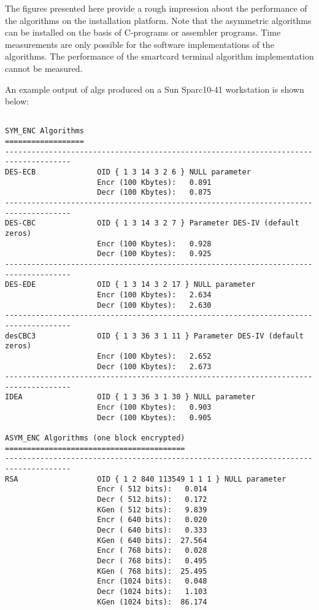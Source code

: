 The figures presented here provide a rough impression about the performance of the algorithms on the 
installation platform. Note that the asymmetric algorithms can be installed on the
basis of C-programs or assembler programs. Time measurements are only possible for the software 
implementations of the algorithms. The performance of the smartcard terminal algorithm
implementation cannot be measured.

An example output of algs produced on a Sun Sparc10-41 workstation is shown below:
{\scriptsize
\begin{verbatim}

SYM_ENC Algorithms
==================
-------------------------------------------------------------------------------------
DES-ECB              OID { 1 3 14 3 2 6 } NULL parameter
                     Encr (100 Kbytes):   0.891  
                     Decr (100 Kbytes):   0.875  
-------------------------------------------------------------------------------------
DES-CBC              OID { 1 3 14 3 2 7 } Parameter DES-IV (default zeros)
                     Encr (100 Kbytes):   0.928  
                     Decr (100 Kbytes):   0.925  
-------------------------------------------------------------------------------------
DES-EDE              OID { 1 3 14 3 2 17 } NULL parameter
                     Encr (100 Kbytes):   2.634  
                     Decr (100 Kbytes):   2.630  
-------------------------------------------------------------------------------------
desCBC3              OID { 1 3 36 3 1 11 } Parameter DES-IV (default zeros)
                     Encr (100 Kbytes):   2.652  
                     Decr (100 Kbytes):   2.673  
-------------------------------------------------------------------------------------
IDEA                 OID { 1 3 36 3 1 30 } NULL parameter
                     Encr (100 Kbytes):   0.903  
                     Decr (100 Kbytes):   0.905  

ASYM_ENC Algorithms (one block encrypted)
=========================================
-------------------------------------------------------------------------------------
RSA                  OID { 1 2 840 113549 1 1 1 } NULL parameter
                     Encr ( 512 bits):   0.014  
                     Decr ( 512 bits):   0.172  
                     KGen ( 512 bits):   9.839  
                     Encr ( 640 bits):   0.020  
                     Decr ( 640 bits):   0.333  
                     KGen ( 640 bits):  27.564  
                     Encr ( 768 bits):   0.028  
                     Decr ( 768 bits):   0.495  
                     KGen ( 768 bits):  25.495  
                     Encr (1024 bits):   0.048  
                     Decr (1024 bits):   1.103  
                     KGen (1024 bits):  86.174  


\end{verbatim}}
